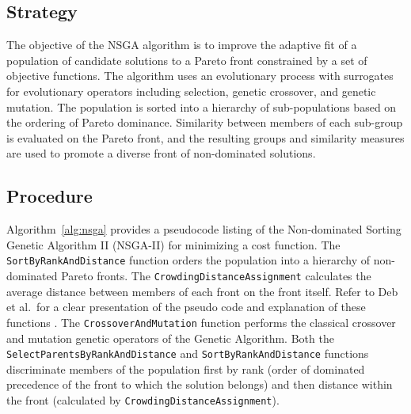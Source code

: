 \subsection{Strategy}
The objective of the NSGA algorithm is to improve the adaptive fit of a population of candidate solutions to a Pareto front constrained by a set of objective functions.
The algorithm uses an evolutionary process with surrogates for evolutionary operators including selection, genetic crossover, and genetic mutation. 
The population is sorted into a hierarchy of sub-populations based on the ordering of Pareto dominance. Similarity between members of each sub-group is evaluated on the Pareto front, and the resulting groups and similarity measures are used to promote a diverse front of non-dominated solutions.

\subsection{Procedure}
Algorithm~\ref{alg:nsga} provides a pseudocode listing of the Non-dominated Sorting Genetic Algorithm II (NSGA-II) for minimizing a cost function. 
The \texttt{SortByRankAndDistance} function orders the population into a hierarchy of non-dominated Pareto fronts. The \texttt{CrowdingDistanceAssignment} calculates the average distance between members of each front on the front itself. Refer to Deb et al.\ for a clear presentation of the pseudo code and explanation of these functions \cite{Deb2002}. The \texttt{CrossoverAndMutation} function performs the classical crossover and mutation genetic operators of the Genetic Algorithm. Both the \texttt{SelectParentsByRankAndDistance} and \texttt{SortByRankAndDistance} functions discriminate members of the population first by rank (order of dominated precedence of the front to which the solution belongs) and then distance within the front (calculated by \texttt{CrowdingDistanceAssignment}).

